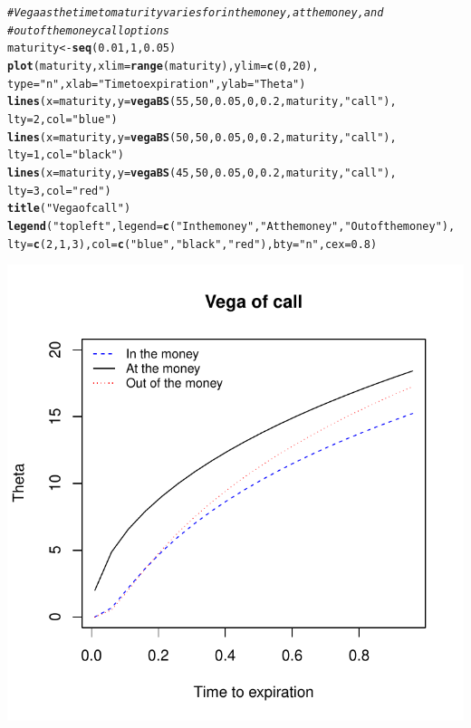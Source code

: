 \documentclass{article}\usepackage[]{graphicx}\usepackage[]{color}
\makeatletter
\def\maxwidth{ %
  \ifdim\Gin@nat@width>\linewidth
    \linewidth
  \else
    \Gin@nat@width
  \fi
}
\newcommand{\hlstr}[1]{\textcolor[rgb]{0.192,0.494,0.8}{#1}}%
\newcommand{\hlcom}[1]{\textcolor[rgb]{0.678,0.584,0.686}{\textit{#1}}}%
\newcommand{\hlkwd}[1]{\textcolor[rgb]{0.737,0.353,0.396}{\textbf{#1}}}%
\newenvironment{kframe}{%
 \def\at@end@of@kframe{}%
 \ifinner\ifhmode%
  \def\at@end@of@kframe{\end{minipage}}%
  \begin{minipage}{\columnwidth}%
 \fi\fi%
 \def\FrameCommand##1{\hskip\@totalleftmargin \hskip-\fboxsep
 \colorbox{shadecolor}{##1}\hskip-\fboxsep
     \hskip-\linewidth \hskip-\@totalleftmargin \hskip\columnwidth}%
 \MakeFramed {\advance\hsize-\width
   \@totalleftmargin\z@ \linewidth\hsize
   \@setminipage}}%
 {\par\unskip\endMakeFramed%
 \at@end@of@kframe}
\newenvironment{knitrout}{}{} %
\makeatother
\begin{document}
\begin{knitrout}
\color{fgcolor}\begin{kframe}
\begin{alltt}
\hlcom{# Vega as the time to maturity varies for in the money, at the money, and}
\hlcom{# out of the money call options}
maturity <- \hlkwd{seq}(0.01, 1, 0.05)
\hlkwd{plot}(maturity, xlim = \hlkwd{range}(maturity), ylim = \hlkwd{c}(0,20), 
     type=\hlstr{"n"}, xlab=\hlstr{"Time to expiration"}, ylab=\hlstr{"Theta"})
\hlkwd{lines}(x = maturity, y = \hlkwd{vegaBS}(55, 50, 0.05, 0, 0.2, maturity, \hlstr{"call"}), 
      lty=2, col=\hlstr{"blue"})
\hlkwd{lines}(x = maturity, y = \hlkwd{vegaBS}(50, 50, 0.05, 0, 0.2, maturity, \hlstr{"call"}), 
      lty=1, col=\hlstr{"black"})
\hlkwd{lines}(x = maturity, y = \hlkwd{vegaBS}(45, 50, 0.05, 0, 0.2, maturity, \hlstr{"call"}), 
      lty=3, col=\hlstr{"red"})
\hlkwd{title}(\hlstr{"Vega of call"})
\hlkwd{legend}(\hlstr{"topleft"}, legend=\hlkwd{c}(\hlstr{"In the money"}, \hlstr{"At the money"}, \hlstr{"Out of the money"}),
       lty=\hlkwd{c}(2,1,3), col=\hlkwd{c}(\hlstr{"blue"}, \hlstr{"black"}, \hlstr{"red"}), bty=\hlstr{"n"}, cex=0.8)
\end{alltt}
\end{kframe}
\includegraphics[width=\maxwidth]{figure/unnamed-chunk-20} 

\end{knitrout}
\end{document}
